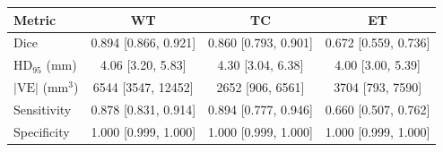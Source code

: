 \begin{tabular}{l c c c}
\toprule
Metric & WT & TC & ET \\
\midrule
Dice & 0.894 [0.866, 0.921] & 0.860 [0.793, 0.901] & 0.672 [0.559, 0.736] \\
HD$_{95}$ (mm) & 4.06 [3.20, 5.83] & 4.30 [3.04, 6.38] & 4.00 [3.00, 5.39] \\
$|\mathrm{VE}|$ (mm$^3$) & 6544 [3547, 12452] & 2652 [906, 6561] & 3704 [793, 7590] \\
Sensitivity & 0.878 [0.831, 0.914] & 0.894 [0.777, 0.946] & 0.660 [0.507, 0.762] \\
Specificity & 1.000 [0.999, 1.000] & 1.000 [0.999, 1.000] & 1.000 [0.999, 1.000] \\
\bottomrule
\end{tabular}
